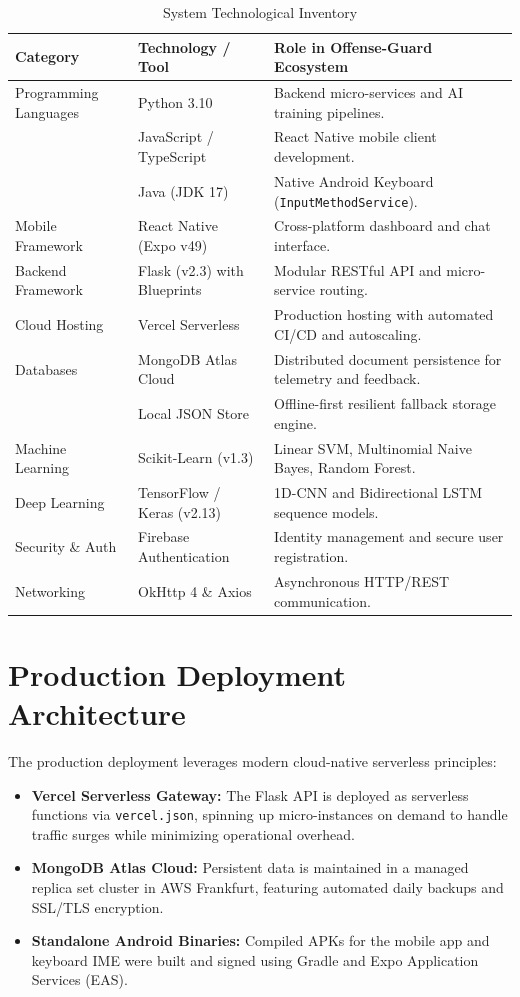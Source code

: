 \documentclass[A4paper,12pt]{report}
\theoremstyle{plain}
\theoremstyle{definition}
\theoremstyle{remark}
\numberwithin{equation}{section}
\begin{document}
\begin{table}[H]
\centering
\caption{System Technological Inventory}
\label{tab:tech_stack}
\renewcommand{\arraystretch}{1.3}
\begin{tabular}{|p{3.5cm}|p{3.5cm}|p{7.5cm}|}
\hline
\textbf{Category} & \textbf{Technology / Tool} & \textbf{Role in Offense-Guard Ecosystem} \\ \hline
Programming Languages & Python 3.10 & Backend micro-services and AI training pipelines. \\ \hline
& JavaScript / TypeScript & React Native mobile client development. \\ \hline
& Java (JDK 17) & Native Android Keyboard (\texttt{InputMethodService}). \\ \hline
Mobile Framework & React Native (Expo v49) & Cross-platform dashboard and chat interface. \\ \hline
Backend Framework & Flask (v2.3) with Blueprints & Modular RESTful API and micro-service routing. \\ \hline
Cloud Hosting & Vercel Serverless & Production hosting with automated CI/CD and autoscaling. \\ \hline
Databases & MongoDB Atlas Cloud & Distributed document persistence for telemetry and feedback. \\ \hline
& Local JSON Store & Offline-first resilient fallback storage engine. \\ \hline
Machine Learning & Scikit-Learn (v1.3) & Linear SVM, Multinomial Naive Bayes, Random Forest. \\ \hline
Deep Learning & TensorFlow / Keras (v2.13) & 1D-CNN and Bidirectional LSTM sequence models. \\ \hline
Security \& Auth & Firebase Authentication & Identity management and secure user registration. \\ \hline
Networking & OkHttp 4 \& Axios & Asynchronous HTTP/REST communication. \\ \hline
\end{tabular}
\end{table}

\section{Production Deployment Architecture}
The production deployment leverages modern cloud-native serverless principles:
\begin{itemize}[leftmargin=*]
    \item \textbf{Vercel Serverless Gateway:} The Flask API is deployed as serverless functions via \texttt{vercel.json}, spinning up micro-instances on demand to handle traffic surges while minimizing operational overhead.
    \item \textbf{MongoDB Atlas Cloud:} Persistent data is maintained in a managed replica set cluster in AWS Frankfurt, featuring automated daily backups and SSL/TLS encryption.
    \item \textbf{Standalone Android Binaries:} Compiled APKs for the mobile app and keyboard IME were built and signed using Gradle and Expo Application Services (EAS).
\end{itemize}
\end{document}
